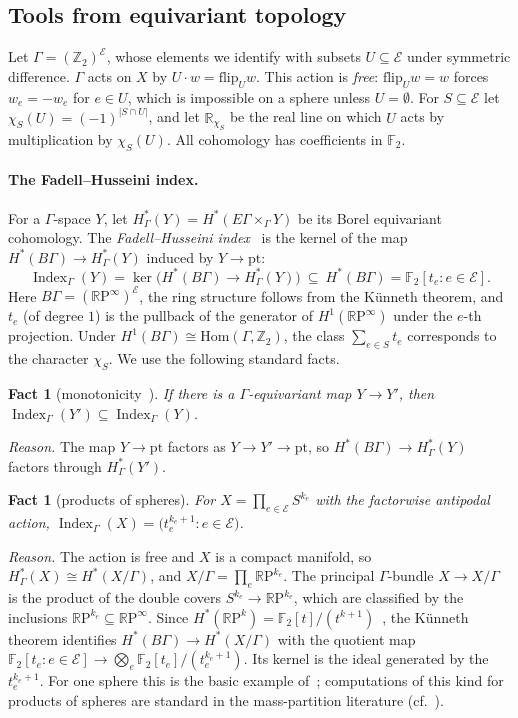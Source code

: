 \documentclass[11pt,letterpaper]{article}
\newtheorem{fact}[theorem]{Fact}
\theoremstyle{definition}
\newcommand{\R}{\mathbb{R}}
\newcommand{\Z}{\mathbb{Z}}
\newcommand{\FF}{\mathbb{F}}
\newcommand{\cE}{\mathcal{E}}
\DeclareMathOperator{\Index}{Index}
\newcommand{\flip}{\mathrm{flip}}
\newcommand{\RP}{\mathbb{R}\mathrm{P}}
\begin{document}
\subsection{Tools from equivariant topology}\label{sec:topology}

Let $\Gamma=(\Z_2)^{\cE}$, whose elements we identify with subsets $U\subseteq\cE$ under
symmetric difference. $\Gamma$ acts on $X$ by $U\cdot w=\flip_Uw$. This action is \emph{free}:
$\flip_Uw=w$ forces $w_e=-w_e$ for $e\in U$, which is impossible on a sphere unless
$U=\emptyset$. For $S\subseteq\cE$ let $\chi_S(U)=(-1)^{|S\cap U|}$, and let $\R_{\chi_S}$ be the
real line on which $U$ acts by multiplication by $\chi_S(U)$. All cohomology has coefficients in
$\FF_2$.

\paragraph{The Fadell--Husseini index.}
For a $\Gamma$-space $Y$, let $H^*_\Gamma(Y)=H^*(E\Gamma\times_\Gamma Y)$ be its Borel equivariant
cohomology. The \emph{Fadell--Husseini index}~\cite{FH88} is the kernel of the map
$H^*(B\Gamma)\to H^*_\Gamma(Y)$ induced by $Y\to\mathrm{pt}$:
\[
  \Index_\Gamma(Y)=\ker\bigl(H^*(B\Gamma)\to H^*_\Gamma(Y)\bigr)\ \subseteq\ H^*(B\Gamma)=\FF_2[t_e:e\in\cE].
\]
Here $B\Gamma=(\RP^\infty)^{\cE}$, the ring structure follows from the K\"unneth theorem, and
$t_e$ (of degree $1$) is the pullback of the generator of $H^1(\RP^\infty)$ under the $e$-th
projection. Under $H^1(B\Gamma)\cong\mathrm{Hom}(\Gamma,\Z_2)$, the class $\sum_{e\in S}t_e$
corresponds to the character $\chi_S$. We use the following standard facts.

\begin{fact}[monotonicity~\cite{FH88}]\label{fact:mono}
If there is a $\Gamma$-equivariant map $Y\to Y'$, then $\Index_\Gamma(Y')\subseteq\Index_\Gamma(Y)$.
\end{fact}

\noindent\emph{Reason.} The map $Y\to\mathrm{pt}$ factors as $Y\to Y'\to\mathrm{pt}$, so
$H^*(B\Gamma)\to H^*_\Gamma(Y)$ factors through $H^*_\Gamma(Y')$.

\begin{fact}[products of spheres]\label{fact:product}
For $X=\prod_{e\in\cE}S^{k_e}$ with the factorwise antipodal action,
$\Index_\Gamma(X)=\bigl(t_e^{k_e+1}:e\in\cE\bigr)$.
\end{fact}

\noindent\emph{Reason.} The action is free and $X$ is a compact manifold, so $H^*_\Gamma(X)\cong
H^*(X/\Gamma)$, and $X/\Gamma=\prod_e\RP^{k_e}$. The principal $\Gamma$-bundle $X\to X/\Gamma$ is
the product of the double covers $S^{k_e}\to\RP^{k_e}$, which are classified by the inclusions
$\RP^{k_e}\subseteq\RP^\infty$. Since $H^*(\RP^k)=\FF_2[t]/(t^{k+1})$~\cite{Hat02}, the K\"unneth
theorem identifies $H^*(B\Gamma)\to H^*(X/\Gamma)$ with the quotient map
$\FF_2[t_e:e\in\cE]\to\bigotimes_e\FF_2[t_e]/(t_e^{k_e+1})$. Its kernel is the ideal generated by
the $t_e^{k_e+1}$. For one sphere this is the basic example of~\cite{FH88}; computations of this
kind for products of spheres are standard in the mass-partition literature (cf.~\cite{MVZ06,BZ17}).
\end{document}
